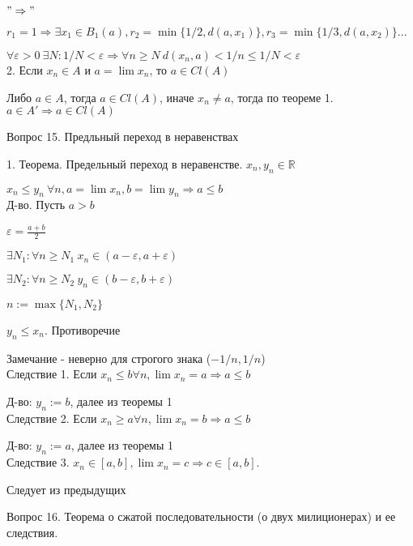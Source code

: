\documentclass[12pt]{article}
\begin{document}
$"\Rightarrow"$

$r_1 = 1 \Rightarrow \exists x_1 \in B_1(a), r_2 = \min\{1/2, d(a, x_1)\}, r_3=\min\{1/3, d(a, x_2)\}...$

$\forall \varepsilon>0\ \exists N: 1/N<\varepsilon \Rightarrow \forall n\geq N\ d(x_n, a) < 1/n \leq 1/N < \varepsilon$\\

2. Если $x_n \in A$ и $a=\lim x_n$, то $a \in Cl(A)$

Либо $a\in A$, тогда $a \in Cl(A)$, иначе $x_n \neq a$, тогда по теореме 1. $a \in A' \Rightarrow a \in Cl(A)$
\newpage

\begin{center}
Вопрос 15. Предльный переход в неравенствах
\end{center}

1. Теорема. Предельный переход в неравенстве. $x_n, y_n \in \mathbb{R}$

$x_n \leq y_n\ \forall n, a=\lim x_n, b=\lim y_n \Rightarrow a\leq b$\\

Д-во. Пусть $a>b$

$\varepsilon = \frac{a+b}{2}$

$\exists N_1: \forall n\geq N_1\ x_n\in (a-\varepsilon, a+\varepsilon)$

$\exists N_2: \forall n\geq N_2\ y_n \in (b-\varepsilon, b+\varepsilon)$

$n:=\max\{N_1, N_2\}$

$y_n \leq x_n$. Противоречие

Замечание - неверно для строгого знака ($-1/n, 1/n$)\\

Следствие 1. Если $x_n \leq b \forall n, \lim x_n = a \Rightarrow a\leq b$

Д-во: $y_n:=b$, далее из теоремы 1\\

Следствие 2. Если $x_n \geq a \forall n, \lim x_n = b \Rightarrow a \leq b$

Д-во: $y_n:=a$, далее из теоремы 1\\

Следствие 3. $x_n \in [a, b], \lim x_n = c \Rightarrow c \in [a, b]$. 

Следует из предыдущих\\
\newpage

\begin{center}
Вопрос 16. Теорема о сжатой последовательности (о двух милиционерах) и ее следствия.
\end{center}
\end{document}
